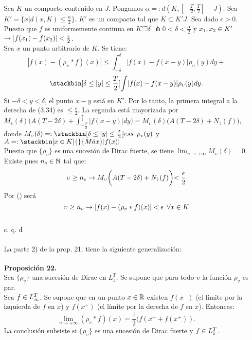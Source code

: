Sea $K$ un compacto contenido en $J$. Pongamos $\alpha=: d(K,[-\frac{T}{2},\frac{T}{2}]-J)$. Sea $K'= \lbrace x| d(x,K) \leq \frac{\alpha}{2} \rbrace$. $K'$ es un compacto tal que $K \subset K' J$. Sea dado $\epsilon >0$. Puesto que $f$ es uniformemente continua en $K' \exists \delta$ $\pitchfork 0<\delta < \frac{\alpha}{2}$ y $x_1, x_2 \in K'$ $\rightarrow |f(x_1)-f(x_2)| < \frac{\epsilon}{2}$. \\
Sea $x$ un punto arbitrario de $K$. Se tiene: 
\begin{equation}
|f(x)-(\rho_\upsilon * f)(x)| \leq \int_{-\delta}^\delta |f(x)-f(x-y)| \rho_\upsilon (y)dy+
\end{equation}
$$
\stackbin[\delta \leq |y| \leq \frac{T}{2}]{}{\int}|f(x)-f(x-y)|\rho_\upsilon (y)dy.
$$
Si $-\delta < y < \delta$, el punto $x-y$ está en $K'$. Por lo tanto, la primera integral a la derecha de (3.34) es $\leq \frac{\epsilon}{2}$. La segunda está mayorizada por $M_\upsilon (\delta) \biggl(A(T-2\delta)+ \int_{-\frac{T}{2}}^{\frac{T}{2}} |f(x-y)|dy \biggl)=M_\upsilon (\delta) \biggl( A(T-2\delta) +N_1 (f) \biggl)$, donde $M_\upsilon (\delta)=: \stackbin[\delta \leq |y| \leq \frac{T}{2}]{}{ess \phantom{s}  \rho_\upsilon (y)}$ y $A=: \stackbin[x \en K]{}{M \acute{a}x} |f(x)|$\\
Puesto que $\lbrace \rho_\upsilon \rbrace$ es una sucesión de Dirac fuerte, se tiene $\lim_{\upsilon \to +\infty }M_\upsilon (\delta)=0$. Existe pues $n_o \in \mathbb{N}$ tal que:
$$
\upsilon \geq n_o \rightarrow M_\upsilon \biggl(A(T-2\delta)+N_1 (f) \biggl) < \frac{\epsilon}{2}
$$
Por () será 
$$
\upsilon \geq n_o \rightarrow |f(x)-(\rho_\upsilon * f)(x)| < \epsilon \phantom{s} \forall x \in K
$$
 \\
 \phantom{sssssssssssssssssssssssssssssssssss sasdasdasdasdadadssada} c. q. d \\ \\
 La parte 2) de la prop. 21. tiene la siguiente generalización:
\\ \\
\textbf{Proposición 22.} \\ 
Sea $\lbrace \rho_\upsilon \rbrace$ una sucesión de Dirac en $L_1^T$. Se supone que para todo $\upsilon$ la función $\rho_\upsilon$ es par. \\
Sea $f \in L_\infty^T$. Se supone que en un punto $x \in \mathbb{R}$ existen $f(x^-)$ (el límite por la izquierda de $f$ en $x$) y $f(x^{+})$ (el límite por la derecha de $f$ en $x$). Entonces: 
$$
\lim_{\upsilon \to +\infty} (\rho_\upsilon * f)(x)=\frac{1}{2}(f(x^{-}+f(x^{+})).
$$
La conclusión subsiste si $\lbrace \rho_\upsilon \rbrace$ es una sucesión de Dirac fuerte y $f \in L_1^T$.  \\
